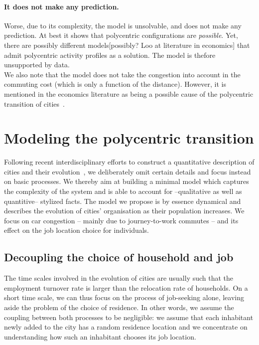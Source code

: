 \paragraph{It does not make any prediction.} Worse, due to its complexity, the
model is unsolvable, and does not make any prediction. At best it shows that
polycentric configurations are \emph{possible}. Yet, there are possibly different
models[possibly? Loo
at literature in economics] that admit polycentric activity profiles as a
solution. The model is thefore unsupported by data.\\ 

We also note that the model does not take the congestion into account in the
commuting cost (which is only a function of the distance). However, it is
mentioned in the economics literature as being a possible cause of the
polycentric transition of cities~\cite{McMillen:2003}. 

\section{Modeling the polycentric transition}
\label{sec:an_out_of_equilibrium_model_}

Following recent interdisciplinary efforts to construct a quantitative
description of cities and their
evolution~\cite{Makse:1995,Zanette:1997,Marsili:1998a,Marsili:1998b,Batty:book2005,Bettencourt:2007,Batty:2008},
we deliberately omit certain details and focus instead on basic processes. We
thereby aim at building a minimal model which captures the complexity of the
system and is able to account for --qualitative as well as quantitive-- stylized
facts. 
The model we propose is by essence dynamical and describes the evolution
of cities' organisation as their population increases. We focus on car
congestion -- mainly due to journey-to-work commutes -- and its effect on the job
location choice for individuals.\\

\subsection{Decoupling the choice of household and job}
\label{sub:decoupling_the_choice_of_household_and_job}

The time scales involved in the evolution of cities are usually such that the
employment turnover rate is larger than the relocation rate of households. On a
short time scale, we can thus focus on the process of job-seeking alone, leaving
aside the problem of the choice of residence. In other words, we assume the
coupling between both processes to be negligible: we assume that each inhabitant
newly added to the city has a random residence location and we concentrate on
understanding how such an inhabitant chooses its job location.\\

